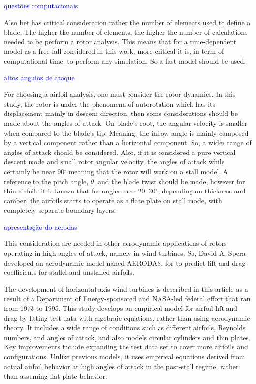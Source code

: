 \textcolor{blue}{questões computacionais}

Also \gls{bet} has critical consideration rather the number of elements used to define a blade. The higher the number of elements, the higher the number of calculations needed to be perform a rotor analysis. This means that for a time-dependent model as a free-fall considered in this work, more critical it is, in term of computational time, to perform any simulation. So a fast model should be used.

\textcolor{blue}{altos angulos de ataque}

For choosing a airfoil analysis, one must consider the rotor dynamics. In this study, the rotor is under the phenomena of autorotation which has its displacement mainly in descent direction, then some considerations should be made about the angles of attack. On blade's root, the angular velocity is smaller when compared to the blade's tip. Meaning, the inflow angle is mainly composed by a vertical component rather than a horizontal component. So, a wider range of angles of attack should be considered. Also, if it is considered a pure vertical descent mode and small rotor angular velocity, the angles of attack while certainly be near 90$^{\circ}$ meaning that the rotor will work on a stall model. A reference to the pitch angle, $\theta$, and the blade twist should be made, however for thin airfoils it is known that for angles near 20~30$^{\circ}$, depending on thickness and camber, the airfoils starts to operate as a flate plate on stall mode, with completely separate boundary layers.

\textcolor{blue}{apresentação do aerodas}

This consideration are needed in other aerodynamic applications of rotors operating in high angles of attack, namely in wind turbines. So, David A. Spera developed an aerodynamic model \cite{spera_models_2008} naned AERODAS, for to predict lift and drag coefficients for stallel and unstalled airfoils. 

The development of horizontal-axis wind turbines is described in this article as a result of a Department of Energy-sponsored and NASA-led federal effort that ran from 1973 to 1995. This study develops an empirical model for airfoil lift and drag by fitting test data with algebraic equations, rather than using aerodynamic theory. It includes a wide range of conditions such as different airfoils, Reynolds numbers, and angles of attack, and also models circular cylinders and thin plates. Key improvements include expanding the test data set to cover more airfoils and configurations. Unlike previous models, it uses empirical equations derived from actual airfoil behavior at high angles of attack in the post-stall regime, rather than assuming flat plate behavior. 


